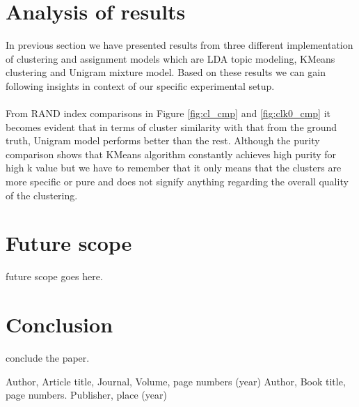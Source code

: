\section{Analysis of results}
In previous section we have presented results from three different implementation of clustering and assignment models which are LDA topic modeling, KMeans clustering and Unigram mixture model. Based on these results we can gain following insights in context of our specific experimental setup.
\paragraph{} From RAND index comparisons in Figure \ref{fig:cl_cmp} and \ref{fig:clk0_cmp} it becomes evident that in terms of cluster similarity with that from the ground truth, Unigram model performs better than the rest. Although the purity comparison shows that KMeans algorithm constantly achieves high purity for high k value but we have to remember that it only means that the clusters are more specific or pure and does not signify anything regarding the overall quality of the clustering.
\paragraph{} 

\section{Future scope} future scope goes here.
\section{Conclusion} conclude the paper.


\begin{thebibliography}{}
%
%
Author, Article title, Journal, Volume, page numbers (year)
Author, Book title, page numbers. Publisher, place (year)
\end{thebibliography}



